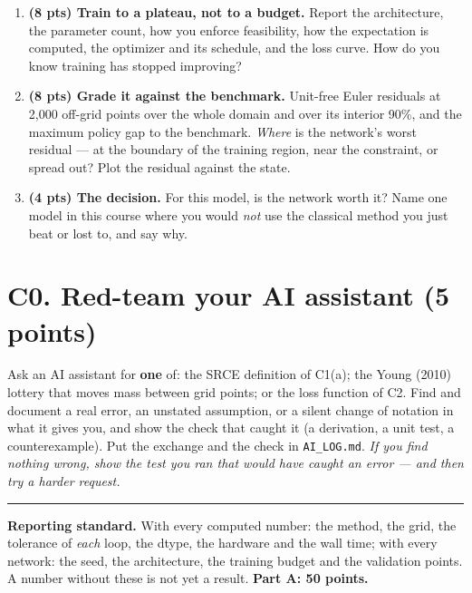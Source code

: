\documentclass[11pt]{article}
\newif\ifsolutions \solutionsfalse
\newcommand{\solution}[1]{\ifsolutions\medskip
  {\color{blue!45!black}\textbf{Solution.} #1}\medskip\fi}
\begin{document}
\begin{enumerate}[label=(\alph*), leftmargin=*]

\item \textbf{(8 pts) Train to a plateau, not to a budget.} Report the architecture, the parameter
count, how you enforce feasibility, how the expectation is computed, the optimizer and its schedule,
and the loss curve. How do you know training has stopped improving?

\solution{\keyCfour}

\item \textbf{(8 pts) Grade it against the benchmark.} Unit-free Euler residuals at 2{,}000 off-grid
points over the whole domain and over its interior 90\%, and the maximum policy gap to the benchmark.
\emph{Where} is the network's worst residual --- at the boundary of the training region, near the
constraint, or spread out? Plot the residual against the state.

\solution{\keyCfive}

\item \textbf{(4 pts) The decision.} For this model, is the network worth it? Name one model in this
course where you would \emph{not} use the classical method you just beat or lost to, and say why.

\solution{\keyCsix}

\end{enumerate}

\section*{C0. Red-team your AI assistant (5 points)}

Ask an AI assistant for \textbf{one} of: the SRCE definition of C1(a); the Young (2010) lottery that
moves mass between grid points; or the loss function of C2. Find and document a real error, an
unstated assumption, or a silent change of notation in what it gives you, and show the check that
caught it (a derivation, a unit test, a counterexample). Put the exchange and the check in
\texttt{AI\_LOG.md}. \emph{If you find nothing wrong, show the test you ran that would have caught
an error --- and then try a harder request.}

\solution{\keyCseven}

\vfill
\noindent\rule{\linewidth}{0.4pt}\par
\small
\textbf{Reporting standard.} With every computed number: the method, the grid, the tolerance of
\emph{each} loop, the dtype, the hardware and the wall time; with every network: the seed, the
architecture, the training budget and the validation points. A number without these is not yet a
result. \textbf{Part A: 50 points.}
\normalsize
\end{document}

